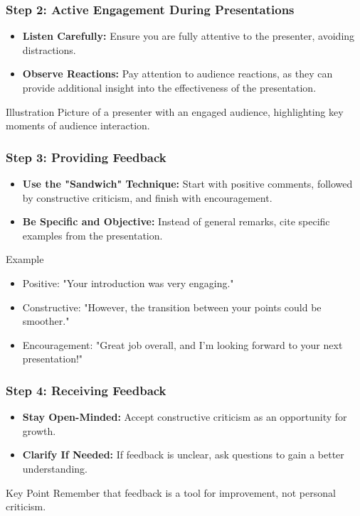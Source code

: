 \documentclass[aspectratio=169]{beamer}
\begin{document}
\begin{frame}[fragile]
    \frametitle{Step 2: Active Engagement During Presentations}
    \begin{itemize}
        \item \textbf{Listen Carefully:} Ensure you are fully attentive to the presenter, avoiding distractions.
        \item \textbf{Observe Reactions:} Pay attention to audience reactions, as they can provide additional insight into the effectiveness of the presentation.
    \end{itemize}
    
    \begin{block}{Illustration}
        Picture of a presenter with an engaged audience, highlighting key moments of audience interaction.
    \end{block}
\end{frame}

\begin{frame}[fragile]
    \frametitle{Step 3: Providing Feedback}
    \begin{itemize}
        \item \textbf{Use the "Sandwich" Technique:} Start with positive comments, followed by constructive criticism, and finish with encouragement.
        \item \textbf{Be Specific and Objective:} Instead of general remarks, cite specific examples from the presentation.
    \end{itemize}

    \begin{block}{Example}
        \begin{itemize}
            \item Positive: "Your introduction was very engaging."
            \item Constructive: "However, the transition between your points could be smoother."
            \item Encouragement: "Great job overall, and I'm looking forward to your next presentation!"
        \end{itemize}
    \end{block}
\end{frame}

\begin{frame}[fragile]
    \frametitle{Step 4: Receiving Feedback}
    \begin{itemize}
        \item \textbf{Stay Open-Minded:} Accept constructive criticism as an opportunity for growth.
        \item \textbf{Clarify If Needed:} If feedback is unclear, ask questions to gain a better understanding.
    \end{itemize}

    \begin{block}{Key Point}
        Remember that feedback is a tool for improvement, not personal criticism.
    \end{block}
\end{frame}
\end{document}
